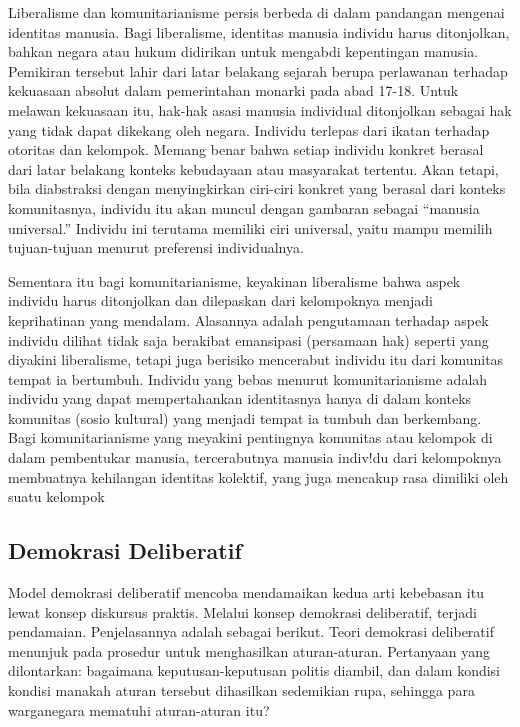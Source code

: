 \documentclass[11pt,twoside,a5paper,openany]{memoir}
\begin{document}
Liberalisme dan komunitarianisme persis berbeda di dalam pandangan
mengenai identitas manusia. Bagi liberalisme, identitas manusia individu
harus ditonjolkan, bahkan negara atau hukum didirikan untuk mengabdi
kepentingan manusia. Pemikiran tersebut lahir dari latar belakang
sejarah berupa perlawanan terhadap kekuasaan absolut dalam pemerintahan
monarki pada abad 17-18. Untuk melawan kekuasaan itu, hak-hak asasi
manusia individual ditonjolkan sebagai hak yang tidak dapat dikekang
oleh negara. Individu terlepas dari ikatan terhadap otoritas dan
kelompok. Memang benar bahwa setiap individu konkret berasal dari latar
belakang konteks kebudayaan atau masyarakat tertentu. Akan tetapi, bila
diabstraksi dengan menyingkirkan ciri-ciri konkret yang berasal dari
konteks komunitasnya, individu itu akan muncul dengan gambaran sebagai
``manusia universal.'' Individu ini terutama memiliki ciri universal,
yaitu mampu memilih tujuan-tujuan menurut preferensi individualnya.

Sementara itu bagi komunitarianisme, keyakinan liberalisme bahwa aspek
individu harus ditonjolkan dan dilepaskan dari kelompoknya menjadi
keprihatinan yang mendalam. Alasannya adalah pengutamaan terhadap aspek
individu dilihat tidak saja berakibat emansipasi (persamaan hak) seperti
yang diyakini liberalisme, tetapi juga berisiko mencerabut individu itu
dari komunitas tempat ia bertumbuh. Individu yang bebas menurut
komunitarianisme adalah individu yang dapat mempertahankan identitasnya
hanya di dalam konteks komunitas (sosio kultural) yang menjadi tempat ia
tumbuh dan berkembang. Bagi komunitarianisme yang meyakini pentingnya
komunitas atau kelompok di dalam pembentukar manusia, tercerabutnya
manusia indiv!du dari kelompoknya membuatnya kehilangan identitas
kolektif, yang juga mencakup rasa dimiliki oleh suatu kelompok

\hypertarget{demokrasi-deliberatif}{%
\subsection{Demokrasi Deliberatif}\label{demokrasi-deliberatif}}

Model demokrasi deliberatif mencoba mendamaikan kedua arti kebebasan itu
lewat konsep diskursus praktis. Melalui konsep demokrasi deliberatif,
terjadi pendamaian. Penjelasannya adalah sebagai berikut. Teori
demokrasi deliberatif menunjuk pada prosedur untuk menghasilkan
aturan-aturan. Pertanyaan yang dilontarkan: bagaimana
keputusan-keputusan politis diambil, dan dalam kondisi kondisi manakah
aturan tersebut dihasilkan sedemikian rupa, sehingga para warganegara
mematuhi aturan-aturan itu?
\end{document}
